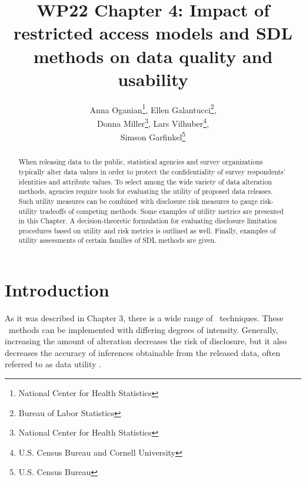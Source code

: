 \documentclass[12pt]{article}
\begin{document}
\title{WP22 Chapter 4: Impact of restricted access models and SDL methods on data quality and usability}

\author{%
Anna Oganian\thanks{National Center for Health Statistics}, 
Ellen Galantucci\thanks{Bureau of Labor Statistics}, \\
Donna Miller\thanks{National Center for Health Statistics}, 
Lars Vilhuber\thanks{U.S. Census Bureau and Cornell University}, \\
Simson Garfinkel\thanks{U.S. Census Bureau}
}

\maketitle

\begin{abstract}
When releasing data to the public, statistical agencies and survey
organizations typically alter data values in order to protect the
confidentiality of survey respondents' identities and attribute
values.  To select among the wide variety of data alteration
methods, agencies require tools for evaluating the utility of
proposed data releases.  Such utility measures can be combined
with disclosure risk measures to gauge risk-utility tradeoffs of
competing methods.  Some examples of utility metrics are presented in this Chapter.
A  decision-theoretic formulation for evaluating
disclosure limitation procedures based on utility and risk metrics is outlined
as well. Finally, examples of utility assessments of certain families of SDL methods are given. 


\end{abstract}

\section{Introduction}\label{sec.intro}

As it was described in Chapter 3, there is a wide range of \SDL\ techniques.
These \SDL\ methods can be implemented with differing degrees of
intensity.  Generally, increasing the amount of alteration
decreases the risk of disclosure, but it also decreases the
accuracy of inferences obtainable from the released data, often
referred to as data utility \citep{Hund10}.
\end{document}
